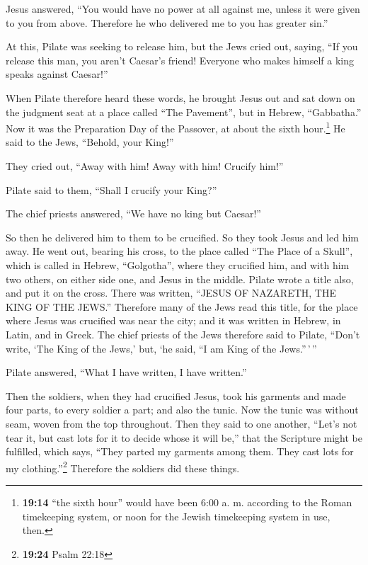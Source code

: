 \begin{paracol}{2}
\begin{otherlanguage}{english}
 Jesus answered, ``You would have no power at all against
me, unless it were given to you from above. Therefore he who delivered
me to you has greater sin.''

 At this, Pilate was seeking to release him, but the Jews
cried out, saying, ``If you release this man, you aren't Caesar's
friend! Everyone who makes himself a king speaks against Caesar!''

 When Pilate therefore heard these words, he brought
Jesus out and sat down on the judgment seat at a place called ``The
Pavement'', but in Hebrew, ``Gabbatha.''  Now it was the
Preparation Day of the Passover, at about the sixth hour.\footnote{\textbf{19:14}
  ``the sixth hour'' would have been 6:00 a. m. according to the Roman
  timekeeping system, or noon for the Jewish timekeeping system in use,
  then.} He said to the Jews, ``Behold, your King!''

 They cried out, ``Away with him! Away with him! Crucify
him!''

Pilate said to them, ``Shall I crucify your King?''

The chief priests answered, ``We have no king but Caesar!''

 So then he delivered him to them to be crucified. So
they took Jesus and led him away.  He went out, bearing
his cross, to the place called ``The Place of a Skull'', which is called
in Hebrew, ``Golgotha'',  where they crucified him, and
with him two others, on either side one, and Jesus in the middle.
 Pilate wrote a title also, and put it on the cross.
There was written, ``JESUS OF NAZARETH, THE KING OF THE JEWS.''
 Therefore many of the Jews read this title, for the
place where Jesus was crucified was near the city; and it was written in
Hebrew, in Latin, and in Greek.  The chief priests of the
Jews therefore said to Pilate, ``Don't write, `The King of the Jews,'
but, `he said, ``I am King of the Jews.''\,'\,''

 Pilate answered, ``What I have written, I have
written.''

 Then the soldiers, when they had crucified Jesus, took
his garments and made four parts, to every soldier a part; and also the
tunic. Now the tunic was without seam, woven from the top throughout.
 Then they said to one another, ``Let's not tear it, but
cast lots for it to decide whose it will be,'' that the Scripture might
be fulfilled, which says, ``They parted my garments among them. They
cast lots for my clothing.''\footnote{\textbf{19:24} Psalm 22:18}
Therefore the soldiers did these things.


\end{otherlanguage}
\end{paracol}
